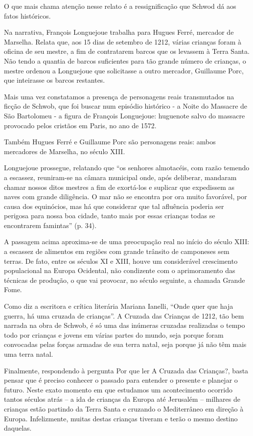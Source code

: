 \documentclass[12pt]{extarticle}
\begin{document}
O que mais chama atenção nesse relato é a ressignificação que Schwod dá
aos fatos históricos.

Na narrativa, François Longuejoue trabalha para Hugues Ferré, mercador
de Marselha. Relata que, aos 15 dias de setembro de 1212, várias
crianças foram à oficina de seu mestre, a fim de contratarem barcos que
os levassem à Terra Santa. Não tendo a quantia de barcos suficientes
para tão grande número de crianças, o mestre ordenou a Longuejoue que
solicitasse a outro mercador, Guillaume Porc, que inteirasse os barcos
restantes.

Mais uma vez constatamos a presença de personagens reais transmutados na
ficção de Schwob, que foi buscar num episódio histórico - a Noite do
Massacre de São Bartolomeu -  a figura de François Longuejoue:
huguenote salvo do massacre provocado pelos cristãos em Paris, no ano de
1572.

Também Hugues Ferré e Guillaume Porc são personagens reais: ambos
mercadores de Marselha, no século XIII.

Longuejoue prossegue, relatando que ``os senhores almotacéis, com razão
temendo a escassez, reuniram-se na câmara municipal onde, após
deliberar, mandaram chamar nossos ditos mestres a fim de exortá-los e
suplicar que expedissem as naves com grande diligência. O mar não se
encontra por ora muito favorável, por causa dos equinócios, mas há que
considerar que tal afluência poderia ser perigosa para nossa boa cidade,
tanto mais por essas crianças todas se encontrarem famintas'' (p. 34).

A passagem acima aproxima-se de uma preocupação real no início do século
XIII: a escassez de alimentos em regiões com grande trânsito de
camponeses sem terras. De fato, entre os séculos XI e XIII, houve um
considerável crescimento populacional na Europa Ocidental, não
condizente com o aprimoramento das técnicas de produção, o que vai
provocar, no século seguinte, a chamada Grande Fome.

Como diz a escritora e crítica literária Mariana Ianelli, ``Onde quer
que haja guerra, há uma cruzada de crianças''. A Cruzada das Crianças
de 1212, tão bem narrada na obra de Schwob, é só uma das inúmeras
cruzadas realizadas o tempo todo por crianças e jovens em várias partes
do mundo, seja porque foram convocadas pelas forças armadas de sua terra
natal, seja porque já não têm mais uma terra natal.

Finalmente, respondendo à pergunta Por que ler A Cruzada das Crianças?,
basta pensar que é preciso conhecer o passado para entender o presente e
planejar o futuro. Neste exato momento em que estudamos um acontecimento
ocorrido tantos séculos atrás -- a ida de crianças da Europa até
Jerusalém -- milhares de crianças estão partindo da Terra Santa e
cruzando o Mediterrâneo em direção à Europa. Infelizmente, muitas destas
crianças tiveram e terão o mesmo destino daquelas.
\end{document}

